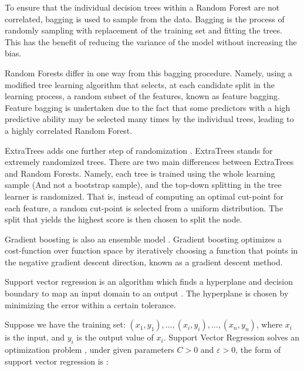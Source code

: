 \documentclass[final,3p,times,twocolumn,numbers]{elsarticle}
\begin{document}
To ensure that the individual decision trees within a Random Forest are not correlated, bagging is used to sample from the data. Bagging is the process of randomly sampling with replacement of the training set and fitting the trees. This has the benefit of reducing the variance of the model without increasing the bias. 

Random Forests differ in one way from this bagging procedure. Namely, using a modified tree learning algorithm that selects, at each candidate split in the learning process, a random subset of the features, known as feature bagging. Feature bagging is undertaken due to the fact that some predictors with a high predictive ability may be selected many times by the individual trees, leading to a highly correlated Random Forest.

ExtraTrees adds one further step of randomization \cite{Fike1988}. ExtraTrees stands for extremely randomized trees. There are two main differences between ExtraTrees and Random Forests. Namely, each tree is trained using the whole learning sample (And not a bootstrap sample), and the top-down splitting in the tree learner is randomized. That is, instead of computing an optimal cut-point for each feature, a random cut-point is selected from a uniform distribution. The split that yields the highest score is then chosen to split the node. 



Gradient boosting is also an ensemble model \cite{316}. Gradient boosting optimizes a cost-function over function space by iteratively choosing a function that points in the negative gradient descent direction, known as a gradient descent method.


Support vector regression is an algorithm which finds a hyperplane and decision boundary to map an input domain to an output \cite{Cortes1995}. The hyperplane is chosen by minimizing the error within a certain tolerance.

Suppose we have the training set: $(x_1,y_1), \ldots,(x_i,y_i),\ldots,(x_n,y_n)$, where $x_i$ is the input, and $y_i$ is the output value of $x_i$. Support Vector Regression solves an optimization problem \cite{Shu2006,Chen2004}, under given parameters $C>0$ and $\varepsilon >0$, the form of support vector regression is \cite{Drucker1997}: 
\end{document}
